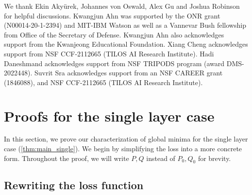 \documentclass{article}
\begin{document}

\begin{ack}
We thank Ekin Akyürek,  Johannes von Oswald, Alex Gu and Joshua Robinson for helpful discussions.
Kwangjun Ahn was supported by the ONR grant (N00014-20-1-2394) and MIT-IBM Watson as
well as a Vannevar Bush fellowship from Office of the Secretary of Defense. Kwangjun Ahn also
acknowledges support from the Kwanjeong Educational Foundation. Xiang Cheng acknowledges
support from NSF CCF-2112665 (TILOS AI Research Institute). Hadi Daneshmand acknowledges support from NSF TRIPODS program (award DMS-2022448). Suvrit Sra acknowledges support
from an NSF CAREER grant (1846088), and NSF CCF-2112665 (TILOS AI Research Institute).


\end{ack}


\appendix
%



\newpage


\appendix
\renewcommand{\appendixpagename}{\centering \LARGE Appendix}
\appendixpage

\startcontents[section]



\newcommand{\proofstep}[2]{{\large \textbf{Step #1:  #2}}\\}

\section{Proofs for the single layer case}
\label{sec:single_proofs}

In this section, we prove our characterization of global minima for the single layer case (\autoref{thm:main_single}).
We begin by simplifying the loss into a more concrete form.
Throughout the proof, we will  write $P,Q$ instead of $P_0,Q_0$ for brevity.


\subsection{Rewriting the loss function}
\label{sec:rewrite loss}
\end{document}
